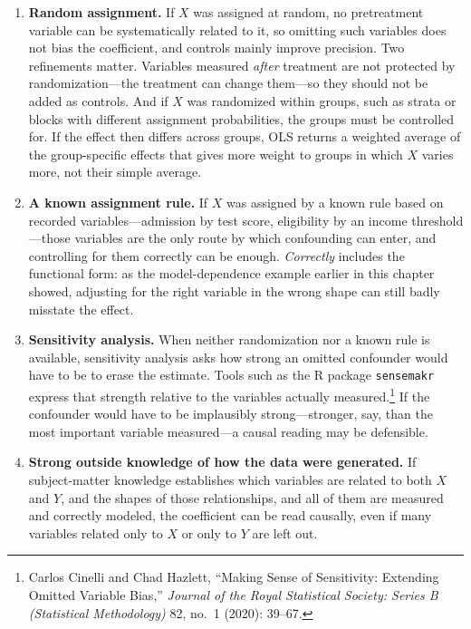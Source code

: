 \documentclass[11pt]{report}
\begin{document}
\begin{enumerate}
    \item \textbf{Random assignment.} If \(X\) was assigned at random, no pretreatment variable can be systematically related to it, so omitting such variables does not bias the coefficient, and controls mainly improve precision. Two refinements matter. Variables measured \emph{after} treatment are not protected by randomization---the treatment can change them---so they should not be added as controls. And if \(X\) was randomized within groups, such as strata or blocks with different assignment probabilities, the groups must be controlled for. If the effect then differs across groups, OLS returns a weighted average of the group-specific effects that gives more weight to groups in which \(X\) varies more, not their simple average.

    \item \textbf{A known assignment rule.} If \(X\) was assigned by a known rule based on recorded variables---admission by test score, eligibility by an income threshold---those variables are the only route by which confounding can enter, and controlling for them correctly can be enough. \emph{Correctly} includes the functional form: as the model-dependence example earlier in this chapter showed, adjusting for the right variable in the wrong shape can still badly misstate the effect.

    \item \textbf{Sensitivity analysis.} When neither randomization nor a known rule is available, sensitivity analysis asks how strong an omitted confounder would have to be to erase the estimate. Tools such as the R package \texttt{sensemakr} express that strength relative to the variables actually measured.\footnote{Carlos Cinelli and Chad Hazlett, ``Making Sense of Sensitivity: Extending Omitted Variable Bias,'' \emph{Journal of the Royal Statistical Society: Series B (Statistical Methodology)} 82, no.~1 (2020): 39--67.} If the confounder would have to be implausibly strong---stronger, say, than the most important variable measured---a causal reading may be defensible.

    \item \textbf{Strong outside knowledge of how the data were generated.} If subject-matter knowledge establishes which variables are related to both \(X\) and \(Y\), and the shapes of those relationships, and all of them are measured and correctly modeled, the coefficient can be read causally, even if many variables related only to \(X\) or only to \(Y\) are left out.
\end{enumerate}
\end{document}
